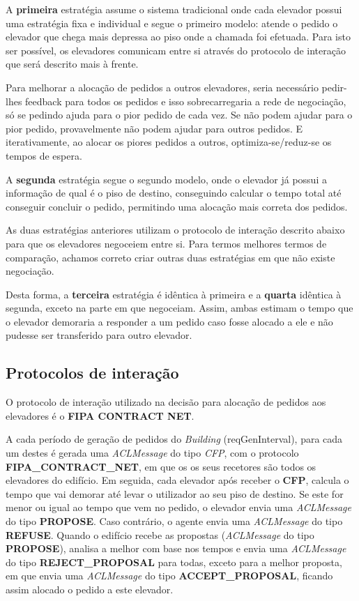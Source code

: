 \documentclass[a4paper]{article}
\begin{document}
A \textbf{primeira} estratégia assume o sistema tradicional onde cada elevador possui uma estratégia fixa e individual e segue o primeiro modelo: atende o pedido o elevador que chega mais depressa ao piso onde a chamada foi efetuada. Para isto ser possível, os elevadores comunicam entre si através do protocolo de interação que será descrito mais à frente. 

Para melhorar a alocação de pedidos a outros elevadores, seria necessário pedir-lhes feedback para todos os pedidos e isso sobrecarregaria a rede de negociação, só se pedindo ajuda para o pior pedido de cada vez. Se não podem ajudar para o pior pedido, provavelmente não podem ajudar para outros pedidos. E iterativamente, ao alocar os piores pedidos a outros, optimiza-se/reduz-se os tempos de espera.

A \textbf{segunda} estratégia segue o segundo modelo, onde o elevador já possui a informação de qual é o piso de destino, conseguindo calcular o tempo total até conseguir concluir o pedido, permitindo uma alocação mais correta dos pedidos.

As duas estratégias anteriores utilizam o protocolo de interação descrito abaixo para que os elevadores negoceiem entre si. Para termos melhores termos de comparação, achamos correto criar outras duas estratégias em que não existe negociação.

Desta forma, a \textbf{terceira} estratégia é idêntica à primeira e a \textbf{quarta} idêntica à segunda, exceto na parte em que negoceiam. Assim, ambas estimam o tempo que o elevador demoraria a responder a um pedido caso fosse alocado a ele e não pudesse ser transferido para outro elevador.

\subsection{Protocolos de interação} 

O protocolo de interação utilizado na decisão para alocação de pedidos aos elevadores é o \textbf{FIPA CONTRACT NET}.

A cada período de geração de pedidos do \textit{Building} (reqGenInterval), para cada um destes é gerada uma \textit{ACLMessage} do tipo \textit{CFP}, com o protocolo \textbf{FIPA\_CONTRACT\_NET}, em que os os seus recetores são todos os elevadores do edifício. Em seguida, cada elevador após receber o \textbf{CFP}, calcula o tempo que vai demorar até levar o utilizador ao seu piso de destino. Se este for menor ou igual ao tempo que vem no pedido, o elevador envia uma \textit{ACLMessage} do tipo \textbf{PROPOSE}. Caso contrário, o agente envia uma \textit{ACLMessage} do tipo \textbf{REFUSE}. Quando o edifício recebe as propostas (\textit{ACLMessage} do tipo \textbf{PROPOSE}), analisa a melhor com base nos tempos e envia uma \textit{ACLMessage} do tipo \textbf{REJECT\_PROPOSAL} para todas, exceto para a melhor proposta, em que envia uma \textit{ACLMessage} do tipo \textbf{ACCEPT\_PROPOSAL}, ficando assim alocado o pedido a este elevador.
\end{document}

